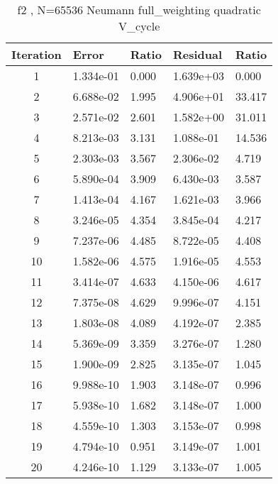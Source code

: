 \documentclass[12]{article}%
\begin{document}
    \begin{table}[H]
        \centering
        \caption{f2 , N=65536  Neumann full\_weighting quadratic V\_cycle}
        \begin{tabular}{|c|l|l|l|l|}
        \hline
        Iteration & Error       & Ratio     & Residual    & Ratio     \\ \hline
 1 & 1.334e-01 & 0.000 & 1.639e+03 & 0.000\\ \hline 
 2 & 6.688e-02 & 1.995 & 4.906e+01 & 33.417\\ \hline 
 3 & 2.571e-02 & 2.601 & 1.582e+00 & 31.011\\ \hline 
 4 & 8.213e-03 & 3.131 & 1.088e-01 & 14.536\\ \hline 
 5 & 2.303e-03 & 3.567 & 2.306e-02 & 4.719\\ \hline 
 6 & 5.890e-04 & 3.909 & 6.430e-03 & 3.587\\ \hline 
 7 & 1.413e-04 & 4.167 & 1.621e-03 & 3.966\\ \hline 
 8 & 3.246e-05 & 4.354 & 3.845e-04 & 4.217\\ \hline 
 9 & 7.237e-06 & 4.485 & 8.722e-05 & 4.408\\ \hline 
 10 & 1.582e-06 & 4.575 & 1.916e-05 & 4.553\\ \hline 
 11 & 3.414e-07 & 4.633 & 4.150e-06 & 4.617\\ \hline 
 12 & 7.375e-08 & 4.629 & 9.996e-07 & 4.151\\ \hline 
 13 & 1.803e-08 & 4.089 & 4.192e-07 & 2.385\\ \hline 
 14 & 5.369e-09 & 3.359 & 3.276e-07 & 1.280\\ \hline 
 15 & 1.900e-09 & 2.825 & 3.135e-07 & 1.045\\ \hline 
 16 & 9.988e-10 & 1.903 & 3.148e-07 & 0.996\\ \hline 
 17 & 5.938e-10 & 1.682 & 3.148e-07 & 1.000\\ \hline 
 18 & 4.559e-10 & 1.303 & 3.153e-07 & 0.998\\ \hline 
 19 & 4.794e-10 & 0.951 & 3.149e-07 & 1.001\\ \hline 
 20 & 4.246e-10 & 1.129 & 3.133e-07 & 1.005\\ \hline       \end{tabular}
    \end{table}
\end{document}
